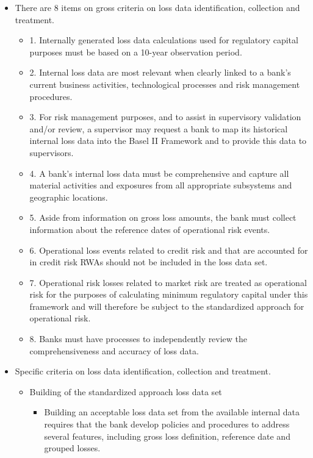 \begin{itemize}
\item There are 8 items on gross criteria on loss data identification, collection and treatment.
    \begin{itemize}
    \item 1. Internally generated loss data calculations used for regulatory capital purposes must be based on a 10-year observation period.
    \item 2. Internal loss data are most relevant when clearly linked to a bank's current business activities, technological processes and risk management procedures.
    \item 3. For risk management purposes, and to assist in supervisory validation and/or review, a supervisor may request a bank to map its historical internal loss data into the Basel II Framework and to provide this data to supervisors.
    \item 4. A bank's internal loss data must be comprehensive and capture all material activities and exposures from all appropriate subsystems and geographic locations.
    \item 5. Aside from information on gross loss amounts, the bank must collect information about the reference dates of operational risk events.
    \item 6. Operational loss events related to credit risk and that are accounted for in credit risk RWAs should not be included in the loss data set.
    \item 7. Operational risk losses related to market risk are treated as operational risk for the purposes of calculating minimum regulatory capital under this framework and will therefore be subject to the standardized approach for operational risk.
    \item 8. Banks must have processes to independently review the comprehensiveness and accuracy of loss data.
    \end{itemize}
\item Specific criteria on loss data identification, collection and treatment.
    \begin{itemize}
    \item Building of the standardized approach loss data set
        \begin{itemize}
        \item Building an acceptable loss data set from the available internal data requires that the bank develop policies and procedures to address several features, including gross loss definition, reference date and grouped losses.
        \end{itemize}
    \end{itemize}


\end{itemize}
